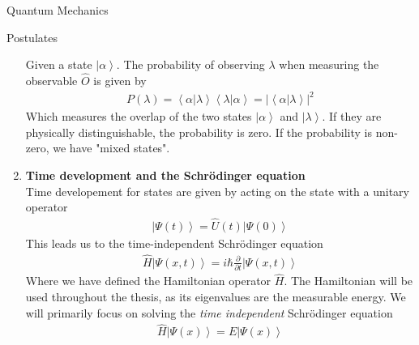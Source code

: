 \documentclass[twoside,english]{uiofysmaster}
\begin{document}
\begin{chapter}{Quantum Mechanics}
\begin{section}{Postulates}
\begin{enumerate}
 			Given a state $\left| \alpha \right>$. The probability of observing $\lambda$ when measuring the observable $\hat O$ is given by 
 			\begin{align}
 				P(\lambda) = \left< \alpha | \lambda \right> \left< \lambda | \alpha \right> = | \left< \alpha | \lambda \right> |^2 
 			\end{align}
 			Which measures the overlap of the two states $\left| \alpha \right>$ and $\left| \lambda \right>$. If they are physically distinguishable, the probability is zero. If the probability is non-zero, we have "mixed states".
 			\item \textbf{Time development and the Schr\"{o}dinger equation}\\
 			Time developement for states are given by acting on the state with a unitary operator
 			\begin{align}
 				\left| \Psi(t) \right> = \hat U(t) \left| \Psi(0) \right>
 			\end{align}
 			This leads us to the time-independent Schr\"{o}dinger equation
 			\begin{align}
 				\hat H \left| \Psi(x,t) \right> = i \hbar \frac{\partial}{\partial t} \left| \Psi(x,t) \right> 
 			\end{align}
 			Where we have defined the Hamiltonian operator $\hat H$. The Hamiltonian will be used throughout the thesis, as its eigenvalues are the measurable energy. We will primarily focus on solving the \textit{time independent} Schr\"{o}dinger equation
 			\begin{align}
 				\hat H \left| \Psi(x) \right> = E \left| \Psi(x) \right> 
 			\end{align} 
 		\end{enumerate}
 	\end{section}


\end{chapter}
\end{document}
